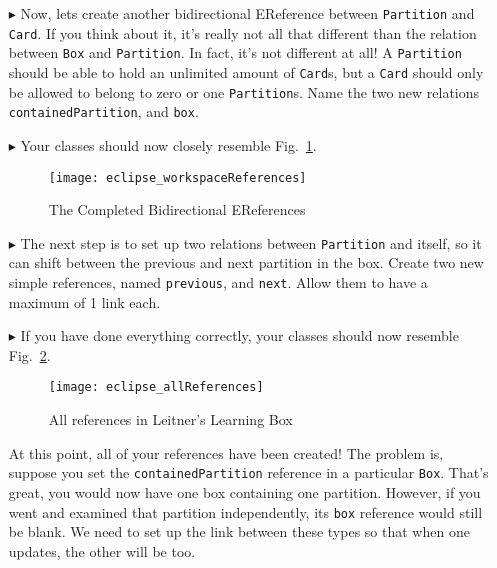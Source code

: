 \begin{itemize}
\newpage

\item[$\blacktriangleright$] Now, lets create another bidirectional EReference between \texttt{Partition} and \texttt{Card}. If you think about it, it's really
not all that different than the relation between \texttt{Box} and \texttt{Partition}. In fact, it's not different at all! A \texttt{Partition} should be able
to hold an unlimited amount of \texttt{Card}s, but a \texttt{Card} should only be allowed to belong to zero or one \texttt{Partition}s. Name the two new
relations \texttt{containedPartition}, and \texttt{box}.

\item[$\blacktriangleright$] Your classes should now closely resemble Fig.~\ref{fig:almostAllReferences}.

\begin{figure}[htbp]
	\centering
  \texttt{[image: eclipse\_workspaceReferences]}
	\caption{The Completed Bidirectional EReferences}
	\label{fig:almostAllReferences}
\end{figure} 

\item[$\blacktriangleright$] The next step is to set up two relations between \texttt{Partition} and itself, so it can shift between the previous and
next partition in the box. Create two new simple references, named \texttt{previous}, and \texttt{next}. Allow them to have a maximum of 1 link each.

\item[$\blacktriangleright$] If you have done everything correctly, your classes should now resemble Fig.~\ref{fig:allReferences}. 

\begin{figure}[htbp]
	\centering
  \texttt{[image: eclipse\_allReferences]}
	\caption{All references in Leitner's Learning Box}
	\label{fig:allReferences}
\end{figure} 

\newpage

At this point, all of your references have been created! The problem is, suppose you set the \texttt{containedPartition} reference in a particular \texttt{Box}.
That's great, you would now have one box containing one partition. However, if you went and examined that partition independently, its \texttt{box} reference
would still be blank. We need to set up the link between these types so that when one updates, the other will be too.


\end{itemize}

